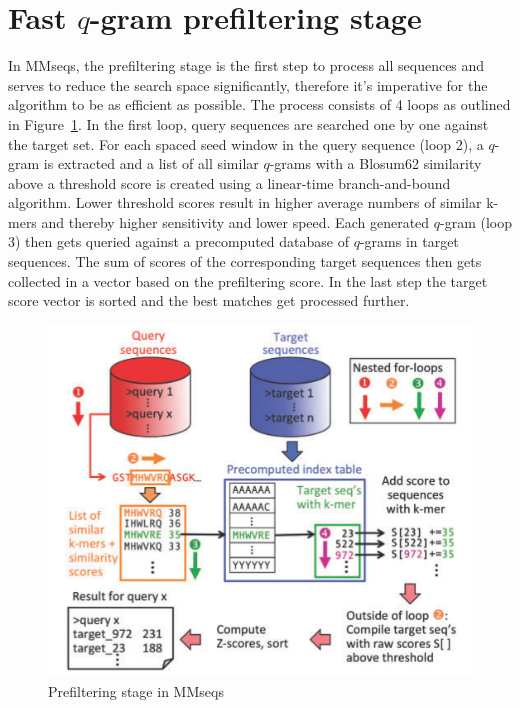 \documentclass[twoside,a4paper,bsc]{master}
\newcommand{\Qgram}[1]{\(#1\)-gram}
\begin{document}
\section{Fast \Qgram{q} prefiltering stage}
In MMseqs, the prefiltering stage is the first step to process all
sequences and serves to reduce the search space significantly, therefore
it's imperative for the algorithm to be as efficient as possible. The
process consists of 4 loops as outlined in
Figure~\ref{fig:prefilterMMseqs}. In the first loop, query sequences are
searched one by one against the target set. For each spaced seed window in
the query sequence (loop 2), a \Qgram{q} is extracted and a list of all
similar \Qgram{q}s with a Blosum62 similarity above a threshold score is
created using a linear-time branch-and-bound algorithm. Lower threshold
scores result in higher average numbers of similar k-mers and thereby
higher sensitivity and lower speed. Each generated \Qgram{q} (loop 3) then
gets queried against a precomputed database of \Qgram{q}s in target
sequences. The sum of scores of the corresponding target sequences then
gets collected in a vector based on the prefiltering score. In the last
step the target score vector is sorted and the best matches get processed
further.
\begin{figure}[t]
\begin{center}
\includegraphics[scale=0.3]{graphics/MMseqs_prefilter.png}
\end{center}
\caption{Prefiltering stage in MMseqs}
\label{fig:prefilterMMseqs}
\end{figure}
\end{document}
